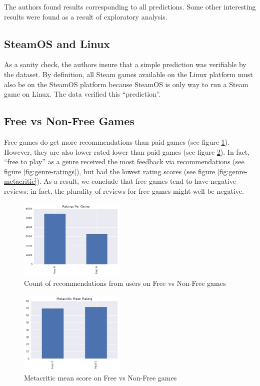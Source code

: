 \documentclass[letterpaper,10pt,twocolumn]{article}
\begin{document}
The authors found results corresponding to all predictions. Some other interesting
results were found as a result of exploratory analysis.

\subsection{SteamOS and Linux}

As a sanity check, the authors insure that a simple prediction was verifiable
by the dataset. By definition, all Steam games available on the Linux platform
must also be on the SteamOS platform because SteamOS is only way to run a Steam
game on Linux. The data verified this ``prediction''.

\subsection{Free vs Non-Free Games}

Free games do get more recommendations than paid games (see figure
\ref{fig:freevnon-ratings}). However, they are also lower rated lower than paid
games (see figure \ref{fig:freevnon-metacritic}). In fact, ``free to play'' as a
genre received the most feedback via recommendations (see figure
\ref{fig:genre-ratings}), but had the lowest rating scores (see figure
\ref{fig:genre-metacritic}). As a result, we conclude that free games tend to
have negative reviews; in fact, the plurality of reviews for free games might
well be negative.

\begin{figure}[H]
    \label{fig:freevnon-ratings}
    \caption{Count of recommendations from users on Free vs Non-Free games}
    \includegraphics[width=0.45\textwidth,keepaspectratio]{freevnon-ratings-bar}
\end{figure}

\begin{figure}[H]
    \label{fig:freevnon-metacritic}
    \caption{Metacritic mean score on Free vs Non-Free games}
    \includegraphics[width=0.45\textwidth,keepaspectratio]{freevnon-metacritic-bar}
\end{figure}
\end{document}
